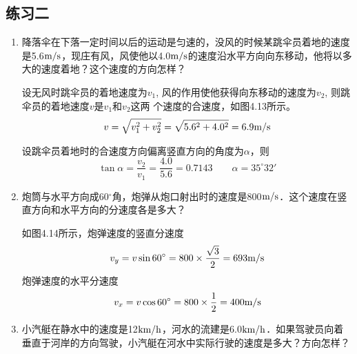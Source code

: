 \subsection{练习二}
\begin{enumerate}
	\item 降落伞在下落一定时间以后的运动是匀速的，没风的时候某跳伞员着地的速度是5.6$\text{m}/\text{s}$，现庄有风，风使他以4.0$\text{m}/\text{s}$的速度沿水平方向向东移动，他将以多大的速度着地？这个速度的方向怎样？

    \begin{solution}
        设无风时跳伞员的着地速度为$v_1$, 风的作用使他获得向东移动的速度为$v_2$, 则跳伞员的着地速度$v$是$v_1$和$v_2$这两
        个速度的合速度，如图4.13所示。
\[v=\sqrt{v^2_1+v^2_2}=\sqrt{5.6^2+4.0^2}=6.9\text{m}/\text{s}\]

        设跳伞员着地时的合速度方向偏离竖直方向的角度为$\alpha$，则
\[\tan\alpha=\frac{v_2}{v_1}=\frac{4.0}{5.6}=0.7143\qquad \alpha=35^{\circ}32'\]
    \end{solution}

\begin{figure}[htp]\centering
    \begin{minipage}[t]{0.48\textwidth}
    \centering
{}
    \caption{}
    \end{minipage}
    \begin{minipage}[t]{0.48\textwidth}
    \centering
    \caption{}
    \end{minipage}
    \end{figure}

\item 炮筒与水平方向成60$^\circ$角，炮弹从炮口射出时的速度是800$\text{m}/\text{s}$．这个速度在竖直方向和水平方向的分速度各是多大？

\begin{solution}
    如图4.14所示，炮弹速度的竖直分速度
\[v_y=v\sin 60^{\circ}=800\times \frac{\sqrt{3}}{2}=693\text{m}/\text{s}\]
炮弹速度的水平分速度
\[v_x=v\cos60^{\circ}=800\times\frac{1}{2}=400\text{m}/\text{s}\]
\end{solution}
\item 小汽艇在静水中的速度是12$\text{km}/\text{h}$，河水的流建是6.0$\text{km}/\text{h}$．如果驾驶员向着垂直于河岸的方向驾驶，小汽艇在河水中实际行驶的速度是多大？方向怎样？


\end{enumerate}
